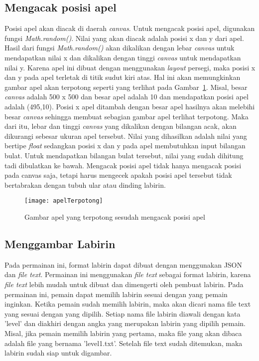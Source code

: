 \subsection{Mengacak posisi apel}
Posisi apel akan diacak di daerah \textit{canvas}. Untuk mengacak posisi apel, digunakan fungsi \textit{Math.random()}. Nilai yang akan diacak adalah posisi x dan y dari apel. Hasil dari fungsi \textit{Math.random()} akan dikalikan dengan lebar \textit{canvas} untuk mendapatkan nilai x dan dikalikan dengan tinggi \textit{canvas} untuk mendapatkan nilai y. Karena apel ini dibuat dengan menggunakan \textit{layout} persegi, maka posisi x dan y pada apel terletak di titik sudut kiri atas. Hal ini akan memungkinkan gambar apel akan terpotong seperti yang terlihat pada Gambar~\ref{fig:apelTerpotong}. Misal, besar \textit{canvas} adalah 500 x 500 dan besar apel adalah 10 dan mendapatkan posisi apel adalah (495,10). Posisi x apel ditambah dengan besar apel hasilnya akan melebihi besar \textit{canvas} sehingga membuat sebagian gambar apel terlihat terpotong. Maka dari itu, lebar dan tinggi \textit{canvas} yang dikalikan dengan bilangan acak, akan dikurangi sebesar ukuran apel tersebut.  Nilai yang dihasilkan adalah nilai yang bertipe \textit{float} sedangkan posisi x dan y pada apel membutuhkan input bilangan bulat. Untuk mendapatkan bilangan bulat tersebut, nilai yang sudah dihitung tadi dibulatkan ke bawah. Mengacak posisi apel tidak hanya mengacak posisi pada canvas saja, tetapi harus mengecek apakah posisi apel tersebut tidak bertabrakan dengan tubuh ular atau dinding labirin. 

\begin{figure}[H]
	\centering  
	\texttt{[image: apelTerpotong]}  
	\caption[Gambar apel yang terpotong sesudah mengacak posisi apel]{Gambar apel yang terpotong sesudah mengacak posisi apel}
	\label{fig:apelTerpotong} 
\end{figure}

\subsection{Menggambar Labirin}
Pada permainan ini, format labirin dapat dibuat dengan menggunakan JSON dan \textit{file text}. Permainan ini menggunakan \textit{file text} sebagai format labirin, karena \textit{file text} lebih mudah untuk dibuat dan dimengerti oleh pembuat labirin. Pada permainan ini, pemain dapat memilih labirin sesuai dengan yang pemain inginkan. Ketika pemain sudah memilih labirin, maka akan dicari nama file text yang sesuai dengan yang dipilih. Setiap nama file labirin diawali dengan kata 'level' dan diakhiri dengan angka yang merupakan labirin yang dipilih pemain. Misal, jika pemain memilih labirin yang pertama, maka file yang akan dibaca adalah file yang bernama 'level1.txt'. Setelah file text sudah ditemukan, maka labirin sudah siap untuk digambar. \\

